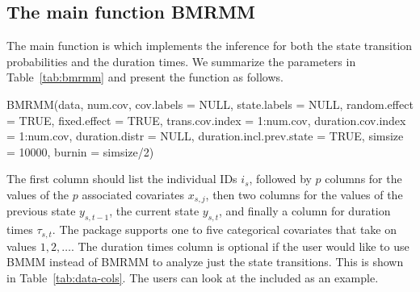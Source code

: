 \subsection{The main function BMRMM}

The main function is  which implements the inference for both the state transition probabilities and the {duration times}. We summarize the parameters  in Table~\ref{tab:bmrmm} and present the function as follows.

\begin{example}
BMRMM(data, num.cov, cov.labels = NULL, state.labels = NULL, 
      random.effect = TRUE, fixed.effect = TRUE, 
      trans.cov.index = 1:num.cov, duration.cov.index = 1:num.cov, 
      duration.distr = NULL, duration.incl.prev.state = TRUE,
      simsize = 10000, burnin = simsize/2)
\end{example}

The first column should list the individual IDs $i_{s}$, followed by $p$ columns for the values of the $p$ associated covariates $x_{s,j}$, 
then two columns for the values of the previous state $y_{s,t-1}$, the current state $y_{s,t}$, and finally a column for {duration times} $\tau_{s,t}$.
{The package supports {one to five} categorical covariates that take on values ${1,2,\dots}$.} 
The {duration times} column is optional if the user would like to use BMMM instead of BMRMM to analyze just the state transitions.
This is shown in Table~\ref{tab:data-cols}.  
The users can look at the included    as an example.

\begin{table}[h]
    \centering
    \caption{Columns of the desired input data set.}
    \label{tab:data-cols}
\end{table}

